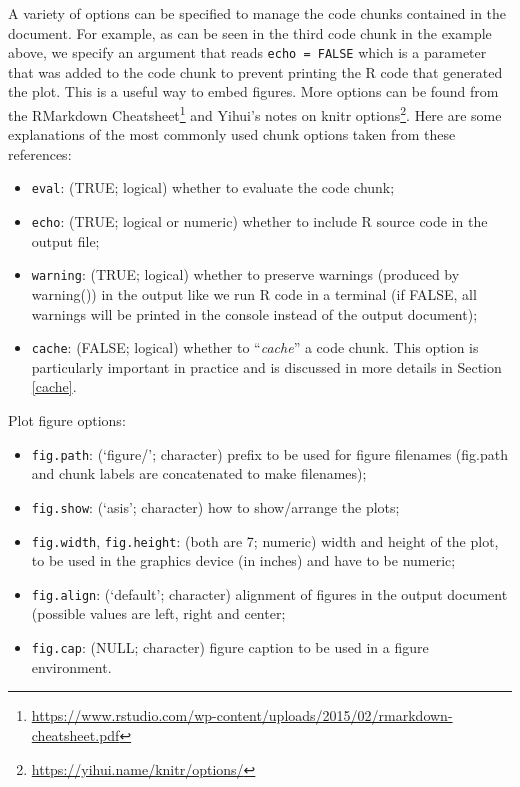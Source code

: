 \documentclass[12pt,]{krantz}
\providecommand{\tightlist}{%
  \setlength{\itemsep}{0pt}\setlength{\parskip}{0pt}}
\renewcommand{\href}[2]{#2\footnote{\url{#1}}}
\begin{document}
A variety of options can be specified to manage the code chunks
contained in the document. For example, as can be seen in the third code
chunk in the example above, we specify an argument that reads
\texttt{echo\ =\ FALSE} which is a parameter that was added to the code
chunk to prevent printing the R code that generated the plot. This is a
useful way to embed figures. More options can be found from the
\href{https://www.rstudio.com/wp-content/uploads/2015/02/rmarkdown-cheatsheet.pdf}{RMarkdown
Cheatsheet} and Yihui's notes on knitr
\href{https://yihui.name/knitr/options/}{options}. Here are some
explanations of the most commonly used chunk options taken from these
references:

\begin{itemize}
\tightlist
\item
  \texttt{eval}: (TRUE; logical) whether to evaluate the code chunk;
\item
  \texttt{echo}: (TRUE; logical or numeric) whether to include R source
  code in the output file;
\item
  \texttt{warning}: (TRUE; logical) whether to preserve warnings
  (produced by warning()) in the output like we run R code in a terminal
  (if FALSE, all warnings will be printed in the console instead of the
  output document);
\item
  \texttt{cache}: (FALSE; logical) whether to ``\emph{cache}'' a code
  chunk. This option is particularly important in practice and is
  discussed in more details in Section \ref{cache}.
\end{itemize}

Plot figure options:

\begin{itemize}
\tightlist
\item
  \texttt{fig.path}: (`figure/'; character) prefix to be used for figure
  filenames (fig.path and chunk labels are concatenated to make
  filenames);
\item
  \texttt{fig.show}: (`asis'; character) how to show/arrange the plots;
\item
  \texttt{fig.width}, \texttt{fig.height}: (both are 7; numeric) width
  and height of the plot, to be used in the graphics device (in inches)
  and have to be numeric;
\item
  \texttt{fig.align}: (`default'; character) alignment of figures in the
  output document (possible values are left, right and center;
\item
  \texttt{fig.cap}: (NULL; character) figure caption to be used in a
  figure environment.
\end{itemize}
\end{document}
